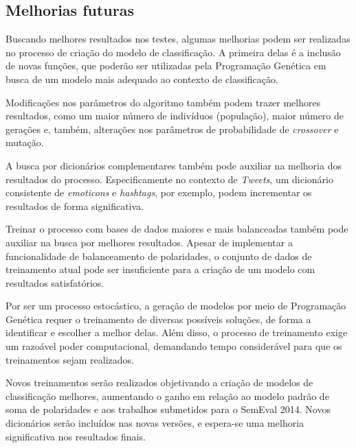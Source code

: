 \documentclass[12pt]{article}
\begin{document}
\subsection{Melhorias futuras}

Buscando melhores resultados nos testes, algumas melhorias podem ser realizadas no processo de criação do modelo de classificação. A primeira delas é a inclusão de novas funções, que poderão ser utilizadas pela Programação Genética em busca de um modelo mais adequado ao contexto de classificação. 

Modificações nos parâmetros do algoritmo também podem trazer melhores resultados, como um maior número de indivíduos (população), maior número de gerações e, também, alterações nos parâmetros de probabilidade de \emph{crossover} e mutação.

A busca por dicionários complementares também pode auxiliar na melhoria dos resultados do processo. Especificamente no contexto de \emph{Tweets}, um dicionário consistente de \emph{emoticons} e \emph{hashtags}, por exemplo, podem incrementar os resultados de forma significativa.

Treinar o processo com bases de dados maiores e mais balanceadas também pode auxiliar na busca por melhores resultados. Apesar de implementar a funcionalidade de balanceamento de polaridades, o conjunto de dados de treinamento atual pode ser insuficiente para a criação de um modelo com resultados satisfatórios.

Por ser um processo estocástico, a geração de modelos por meio de Programação Genética requer o treinamento de diversas possíveis soluções, de forma a identificar e escolher a melhor delas. Além disso, o processo de treinamento exige um razoável poder computacional, demandando tempo considerável para que os treinamentos sejam realizados.

Novos treinamentos serão realizados objetivando a criação de modelos de classificação melhores, aumentando o ganho em relação ao modelo padrão de soma de polaridades e aos trabalhos submetidos para o SemEval 2014. Novos dicionários serão incluídos nas novas versões, e espera-se uma melhoria significativa nos resultados finais.




\end{document}
